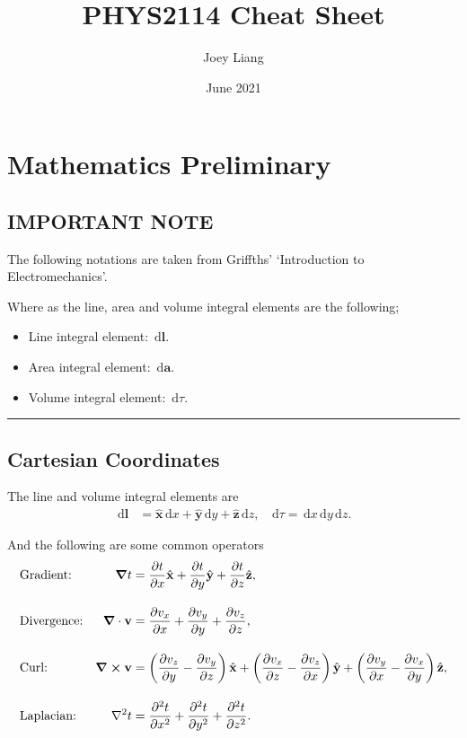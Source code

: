 \documentclass[a4paper]{article}
\title{PHYS2114 Cheat Sheet}
\date{June 2021}
\author{Joey Liang}
\newcommand{\dmr}[1]{\, \mathrm{d}#1} %
\numberwithin{equation}{subsection}
\let\oldhat\hat
\renewcommand{\vec}[1]{\mathbf{#1}}
\renewcommand{\hat}[1]{\oldhat{\mathbf{#1}}}
\begin{document}
\maketitle
\newpage
\tableofcontents
\newpage
\section{Mathematics Preliminary}
\subsection{IMPORTANT NOTE}
The following notations are taken from Griffths' `Introduction to Electromechanics'.\cite{Griffiths:611579}

Where as the line, area and volume integral elements are the following;
\begin{itemize}
    \item Line integral element: $\dmr{\vec{l}}.$
    \item Area integral element: $\dmr{\vec{a}}.$ 
    \item Volume integral element: $\dmr{\tau}.$
\end{itemize}

\par\noindent\rule{\textwidth}{0.4pt}

\subsection{Cartesian Coordinates}
The line and volume integral elements are
\begin{align*}
    \dmr{\vec{l}} &= \hat{x}\dmr{x} + \hat{y}\dmr{y} + \hat{z}\dmr{z}, & \dmr{\tau} = \dmr{x}\dmr{y}\dmr{z}.
\end{align*}

And the following are some common operators
\begin{align*}
    &\text{Gradient:} &\grad t  &= \pdv{t}{x}\hat{x} + \pdv{t}{y}\hat{y} + \pdv{t}{z}\hat{z},\\[1em]
    &\text{Divergence:} &\grad\cdot\vec{v} &= \pdv{v_x}{x} + \pdv{v_y}{y} + \pdv{v_z}{z},\\[1em]
    &\text{Curl:} &\grad \cross \vec{v} &= \left(\pdv{v_z}{y}-\pdv{v_y}{z}\right)\hat{x} + \left(\pdv{v_x}{z}-\pdv{v_z}{x}\right)\hat{y} + \left(\pdv{v_y}{x}-\pdv{v_x}{y}\right)\hat{z},\\[1em]
    &\text{Laplacian:} &\laplacian t &= \pdv[2]{t}{x} + \pdv[2]{t}{y} +\pdv[2]{t}{z}. 
\end{align*}
\end{document}
